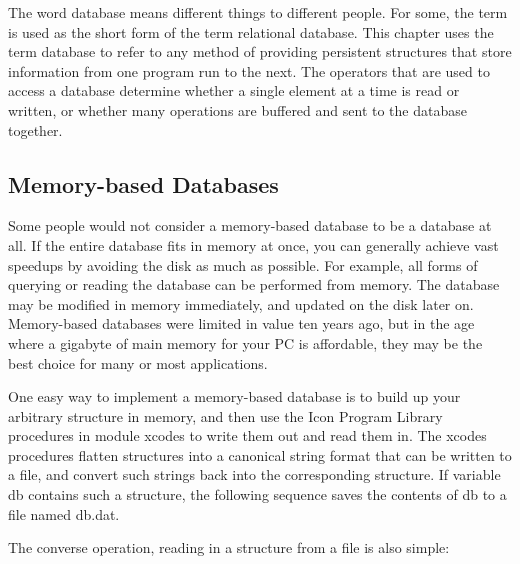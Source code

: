 The word {\textquotedbl}database{\textquotedbl} means different things
to different people. For some, the term is used as the short form of
the term {\textquotedbl}relational database.{\textquotedbl} This
chapter uses the term database to refer to any method of providing
{\textquotedbl}persistent structures{\textquotedbl} that store
information from one program run to the next. The operators that are
used to access a database determine whether a single element at a time
is read or written, or whether many operations are buffered and sent to
the database together.

\subsection{Memory-based Databases}
Some people would not consider a memory-based
database to be a database at all. If the
entire database fits in memory at once, you can generally achieve vast
speedups by avoiding the disk as much as possible. For example, all
forms of querying or reading the database can be performed from memory.
The database may be modified in memory immediately, and updated on the
disk later on. Memory-based databases were limited in value ten years
ago, but in the age where a gigabyte of main memory for your PC is
affordable, they may be the best choice for many or most applications.

One easy way to implement a memory-based database is to build up your
arbitrary structure in memory, and then use the Icon Program Library
procedures in module \textsf{xcodes} to write them out and read them
in. The \textsf{xcodes} procedures flatten structures
into a canonical string format that can be written to a file, and
convert such strings back into the corresponding structure. If variable
\textsf{db} contains such a structure, the following sequence saves the
contents of \textsf{db} to a file named \textsf{db.dat.}


\noindent
The converse operation, reading in a structure from a file is also
simple:

